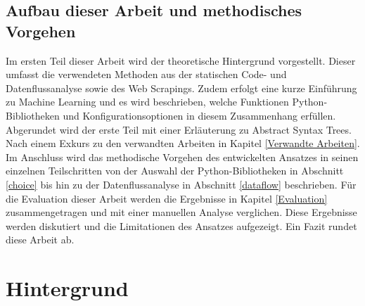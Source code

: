 \documentclass[german,bachelor]{swsLeipzig}
\begin{document}
\section{Aufbau dieser Arbeit und methodisches Vorgehen}
Im ersten Teil dieser Arbeit wird der theoretische Hintergrund vorgestellt.
Dieser umfasst die verwendeten Methoden aus der statischen Code- und Datenflussanalyse sowie des Web Scrapings.
Zudem erfolgt eine kurze Einführung zu Machine Learning und es wird beschrieben, welche Funktionen Python-Bibliotheken und
Konfigurationsoptionen in diesem Zusammenhang erfüllen.
Abgerundet wird der erste Teil mit einer Erläuterung zu Abstract Syntax Trees.
Nach einem Exkurs zu den verwandten Arbeiten in Kapitel \ref{Verwandte Arbeiten}.
Im Anschluss wird das methodische Vorgehen des entwickelten Ansatzes in seinen einzelnen Teilschritten von der Auswahl
der Python-Bibliotheken in Abschnitt \ref{choice} bis hin zu der Datenflussanalyse in Abschnitt \ref{dataflow} beschrieben.
Für die Evaluation dieser Arbeit werden die Ergebnisse in Kapitel \ref{Evaluation} zusammengetragen und mit einer manuellen Analyse verglichen.
Diese Ergebnisse werden diskutiert und die Limitationen des Ansatzes aufgezeigt.
Ein Fazit rundet diese Arbeit ab.

\chapter{Hintergrund}\label{Hintergrund}
\end{document}
